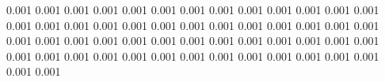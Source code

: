 0.001      0.001      %
0.001      0.001      %
0.001      0.001      %
0.001      0.001      %
0.001      0.001      %
0.001      0.001      %
0.001      0.001      %
0.001      0.001      %
0.001      0.001      %
0.001      0.001      %
0.001      0.001      %
0.001      0.001      %
0.001      0.001      %
0.001      0.001      %
0.001      0.001      %
0.001      0.001      %
0.001      0.001      %
0.001      0.001      %
0.001      0.001      %
0.001      0.001      %
0.001      0.001      %
0.001      0.001      %
0.001      0.001      %
0.001      0.001      %
0.001      0.001      %
0.001      0.001      %
0.001      0.001      %
